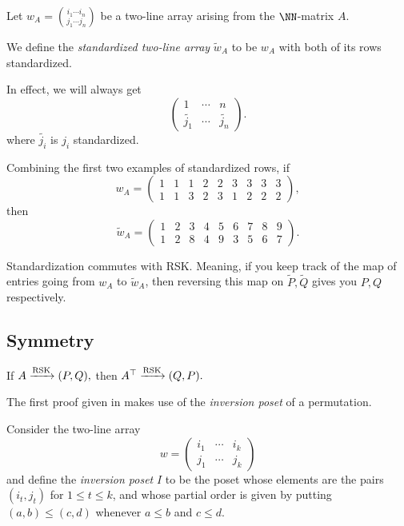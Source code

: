 \documentclass{article}
\DeclareMathOperator{\RSK}{RSK}
\newcommand{\rskarrow}{\ensuremath\xrightarrow{\RSK}}
\begin{document}
\begin{definition}
    Let $w_A = \binom{i_1\cdots i_n}{j_1\cdots j_n}$ be a two-line array arising from the $\NN$-matrix $A$.

    We define the \textit{standardized two-line array} $\widetilde{w}_A$ to be $w_A$ with both of its rows standardized. 
\end{definition}

In effect, we will always get 
\[
    \begin{pmatrix}
        1 & \cdots & n \\
        \widetilde{j_1} & \cdots & \widetilde{j_n}
    \end{pmatrix}.
\]
where $\widetilde{j_i}$ is $j_i$ standardized.

\begin{example}
    Combining the first two examples of standardized rows, if
    \[
        w_A = \begin{pmatrix}
            1 & 1 & 1 & 2 & 2 & 3 & 3 & 3 & 3 \\
            1 & 1 & 3 & 2 & 3 & 1 & 2 & 2 & 2
        \end{pmatrix},
    \]
    then
    \[
        \widetilde{w}_A = \begin{pmatrix}
            1 & 2 & 3 & 4 & 5 & 6 & 7 & 8 & 9 \\
1 & 2 & 8 & 4 & 9 & 3 & 5 & 6 & 7
        \end{pmatrix}.
    \]
\end{example}

\begin{lemma}
    Standardization commutes with RSK.
    Meaning, if you keep track of the map of entries going from $w_A$ to $\widetilde{w}_A$, then reversing this map on $\widetilde{P},\widetilde{Q}$ gives you $P,Q$ respectively.
\end{lemma}

\subsection{Symmetry}

\begin{theorem}\label{thm:rsksymmetry}
    If $A \rskarrow (P,Q),$ then $A^\top \rskarrow (Q,P).$
\end{theorem}

The first proof given in \cite{StanleyEC2} makes use of the \textit{inversion poset} of a permutation.

\begin{definition}
    Consider the two-line array
    \[
        w = \begin{pmatrix}
            i_1 & \cdots & i_k \\
            j_1 & \cdots & j_k
        \end{pmatrix}
    \]
    and define the \textit{inversion poset} $I$ to be the poset whose elements are the pairs $(i_t, j_t)$ for $1 \leq t \leq k$, and whose partial order is given by putting $(a,b) \leq (c,d)$ whenever $a \leq b$ and $c \leq d$.
\end{definition}
\end{document}
